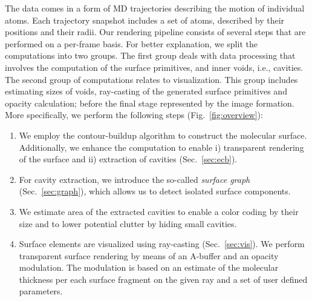 The data comes in a form of MD trajectories describing the motion of individual atoms. 
Each trajectory snapshot includes a set of atoms, described by their positions and their radii. 
Our rendering pipeline consists of several steps that are performed on a per-frame basis. 
For better explanation, we split the computations into two groups. 
The first group deals with data processing that involves the computation of the surface primitives, and inner voids, i.e., cavities.
The second group of computations relates to visualization. 
This group includes estimating sizes of voids, ray-casting of the generated surface primitives and opacity calculation; before the final stage represented by the image formation. More specifically, we perform the following steps (Fig.~\ref{fig:overview}):
	\begin{enumerate}
	  \item We employ the contour-buildup algorithm to construct the molecular surface. Additionally, we enhance the computation to enable i) transparent rendering of the surface and ii) extraction of cavities (Sec.~\ref{sec:ecb}).
		\item For cavity extraction, we introduce the so-called \textit{surface graph} (Sec.~\ref{sec:graph}), which allows us to detect isolated surface components.
		\item We estimate area of the extracted cavities to enable a color coding by their size and to lower potential clutter by hiding small cavities.
		\item Surface elements are visualized using ray-casting (Sec.~\ref{sec:vis}). We perform transparent surface rendering by means of an A-buffer and an opacity modulation. The modulation is based on an estimate of the molecular thickness per each surface fragment on the given ray and a set of user defined parameters.
	\end{enumerate}